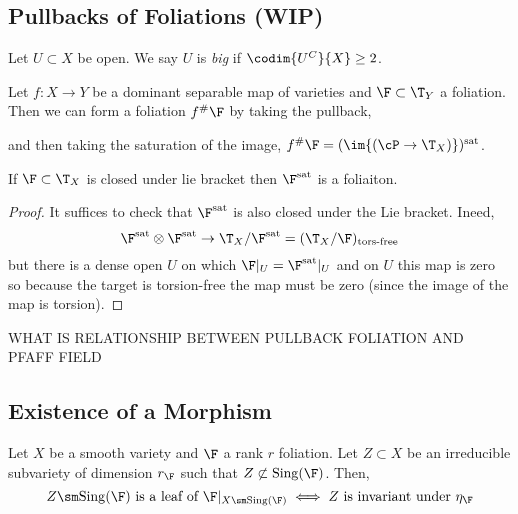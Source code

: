 \documentclass[12pt]{article}
\begin{document}
\subsection{Pullbacks of Foliations (WIP)}

\begin{defn}
Let $U \subset X$ be open. We say $U$ is \textit{big} if $\codim{U^C}{X} \ge 2$.
\end{defn}

\begin{defn}
Let $f : X \to Y$ be a dominant separable map of varieties and $\F \subset \T_Y$ a foliation. Then we can form a foliation $f^{\#} \F$ by taking the pullback,
\begin{center}
\end{center}
and then taking the saturation of the image, $f^{\#} \F = (\im{(\cP \to \T_X)})^\sat$.
\end{defn}

\begin{prop}
If $\F \subset \T_X$ is closed under lie bracket then $\F^\sat$ is a foliaiton.
\end{prop}

\begin{proof}
It suffices to check that $\F^\sat$ is also closed under the Lie bracket. Ineed, 
\[ \F^\sat \otimes \F^\sat \to \T_X / \F^\sat = (\T_X / \F)_{\text{tors-free}} \]
but there is a dense open $U$ on which $\F|_U = \F^\sat|_U$ and on $U$ this map is zero so because the target is torsion-free the map must be zero (since the image of the map is torsion). 
\end{proof}

WHAT IS RELATIONSHIP BETWEEN PULLBACK FOLIATION AND PFAFF FIELD

\subsection{Existence of a Morphism}

\begin{lemma} \label{leaf-pfaff}
Let $X$ be a smooth variety and $\F$ a rank $r$ foliation. Let $Z \subset X$ be an irreducible subvariety of dimension $r_\F$ such that $Z \not\subset \Sing(\F)$. Then,
\[ Z \sm \Sing(\F) \text{ is a leaf of } \F|_{X \sm \Sing(\F)} \iff Z \text{ is invariant under } \eta_{\F} \]
\end{lemma}
\end{document}
